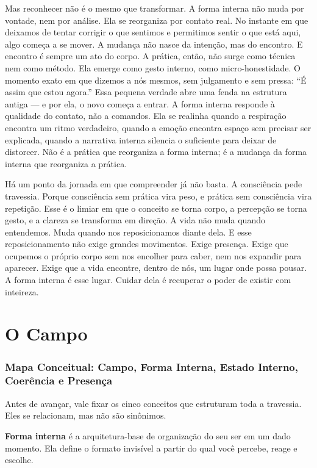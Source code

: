 \documentclass[12pt]{book}
\begin{document}
Mas reconhecer não é o mesmo que transformar. A forma interna não muda por vontade, nem por análise. Ela se reorganiza por contato real. No instante em que deixamos de tentar corrigir o que sentimos e permitimos sentir o que está aqui, algo começa a se mover. A mudança não nasce da intenção, mas do encontro. E encontro é sempre um ato do corpo. A prática, então, não surge como técnica nem como método. Ela emerge como gesto interno, como micro-honestidade. O momento exato em que dizemos a nós mesmos, sem julgamento e sem pressa: \enquote{É assim que estou agora.} Essa pequena verdade abre uma fenda na estrutura antiga --- e por ela, o novo começa a entrar. A forma interna responde à qualidade do contato, não a comandos. Ela se realinha quando a respiração encontra um ritmo verdadeiro, quando a emoção encontra espaço sem precisar ser explicada, quando a narrativa interna silencia o suficiente para deixar de distorcer. Não é a prática que reorganiza a forma interna; é a mudança da forma interna que reorganiza a prática.

Há um ponto da jornada em que compreender já não basta. A consciência pede travessia. Porque consciência sem prática vira peso, e prática sem consciência vira repetição. Esse é o limiar em que o conceito se torna corpo, a percepção se torna gesto, e a clareza se transforma em direção. A vida não muda quando entendemos. Muda quando nos reposicionamos diante dela. E esse reposicionamento não exige grandes movimentos. Exige presença. Exige que ocupemos o próprio corpo sem nos encolher para caber, nem nos expandir para aparecer. Exige que a vida encontre, dentro de nós, um lugar onde possa pousar. A forma interna é esse lugar. Cuidar dela é recuperar o poder de existir com inteireza.

\chapter{O Campo}

\subsection*{Mapa Conceitual: Campo, Forma Interna, Estado Interno, Coerência e Presença}

Antes de avançar, vale fixar os cinco conceitos que estruturam toda a travessia. Eles se relacionam, mas não são sinônimos.

\textbf{Forma interna} é a arquitetura-base de organização do seu ser em um dado momento. Ela define o formato invisível a partir do qual você percebe, reage e escolhe.
\end{document}
